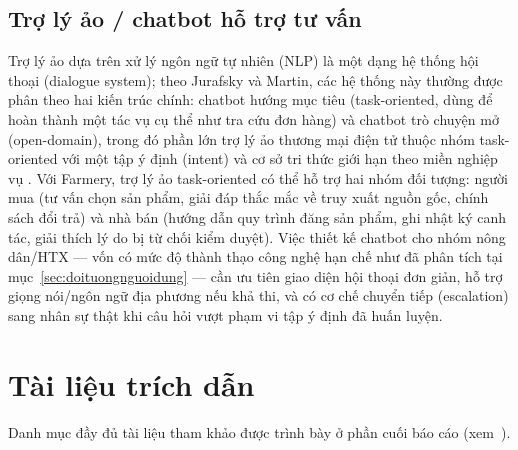 \subsection{Trợ lý ảo / chatbot hỗ trợ tư vấn}
Trợ lý ảo dựa trên xử lý ngôn ngữ tự nhiên (NLP) là một dạng hệ thống hội thoại (dialogue system); theo Jurafsky và Martin, các hệ thống này thường được phân theo hai kiến trúc chính: chatbot hướng mục tiêu (task-oriented, dùng để hoàn thành một tác vụ cụ thể như tra cứu đơn hàng) và chatbot trò chuyện mở (open-domain), trong đó phần lớn trợ lý ảo thương mại điện tử thuộc nhóm task-oriented với một tập ý định (intent) và cơ sở tri thức giới hạn theo miền nghiệp vụ \cite{jurafsky2023dialogue}. Với Farmery, trợ lý ảo task-oriented có thể hỗ trợ hai nhóm đối tượng: người mua (tư vấn chọn sản phẩm, giải đáp thắc mắc về truy xuất nguồn gốc, chính sách đổi trả) và nhà bán (hướng dẫn quy trình đăng sản phẩm, ghi nhật ký canh tác, giải thích lý do bị từ chối kiểm duyệt). Việc thiết kế chatbot cho nhóm nông dân/HTX --- vốn có mức độ thành thạo công nghệ hạn chế như đã phân tích tại mục~\ref{sec:doituongnguoidung} --- cần ưu tiên giao diện hội thoại đơn giản, hỗ trợ giọng nói/ngôn ngữ địa phương nếu khả thi, và có cơ chế chuyển tiếp (escalation) sang nhân sự thật khi câu hỏi vượt phạm vi tập ý định đã huấn luyện.

\section*{Tài liệu trích dẫn}
Danh mục đầy đủ tài liệu tham khảo được trình bày ở phần cuối báo cáo (xem~).
